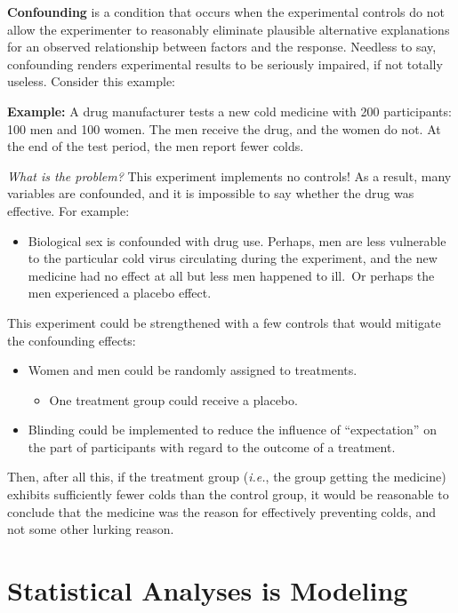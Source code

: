 \documentclass[
]{book}
\providecommand{\tightlist}{%
  \setlength{\itemsep}{0pt}\setlength{\parskip}{0pt}}
\begin{document}
\textbf{Confounding} is a condition that occurs when the experimental controls do not allow the experimenter to reasonably eliminate plausible alternative explanations for an observed relationship between factors and the response.
Needless to say, confounding renders experimental results to be seriously impaired, if not totally useless.
Consider this example:

\textbf{Example:} A drug manufacturer tests a new cold medicine with 200 participants: 100 men and 100 women.
The men receive the drug, and the women do not.
At the end of the test period, the men report fewer colds.

\emph{What is the problem?} This experiment implements no controls!
As a result, many variables are confounded, and it is impossible to say whether the drug was effective.
For example:

\begin{itemize}
\tightlist
\item
  Biological sex is confounded with drug use. Perhaps, men are less vulnerable to the particular cold virus circulating during the experiment, and the new medicine had no effect at all but less men happened to ill.~Or perhaps the men experienced a placebo effect.
\end{itemize}

This experiment could be strengthened with a few controls that would mitigate the confounding effects:

\begin{itemize}
\tightlist
\item
  Women and men could be randomly assigned to treatments.

  \begin{itemize}
  \tightlist
  \item
    One treatment group could receive a placebo.
  \end{itemize}
\item
  Blinding could be implemented to reduce the influence of ``expectation'' on the part of participants with regard to the outcome of a treatment.
\end{itemize}

Then, after all this, if the treatment group (\emph{i.e.}, the group getting the medicine) exhibits sufficiently fewer colds than the control group, it would be reasonable to conclude that the medicine was the reason for effectively preventing colds, and not some other lurking reason.

\hypertarget{statistical-analyses-is-modeling}{%
\section{Statistical Analyses is Modeling}\label{statistical-analyses-is-modeling}}
\end{document}
